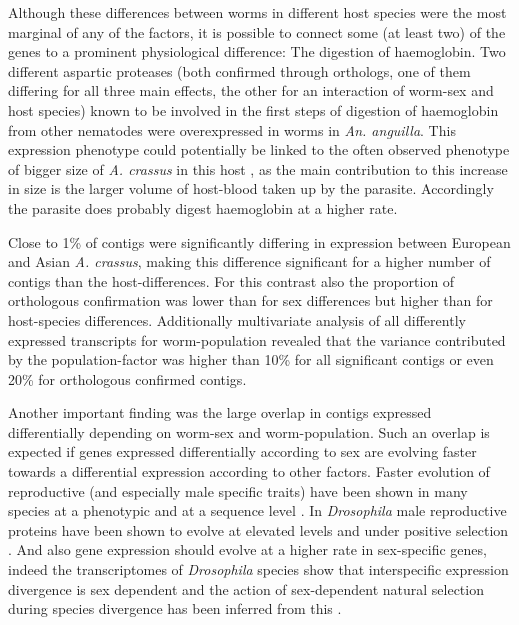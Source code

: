Although these differences between worms in different host species
were the most marginal of any of the factors, it is possible to
connect some (at least two) of the genes to a prominent physiological
difference: The digestion of haemoglobin. Two different aspartic
proteases (both confirmed through orthologs, one of them differing
for all three main effects, the other for an interaction of worm-sex
and host species) known to be involved in the first steps of digestion
of haemoglobin from other nematodes \cite{pmid12782060} were
overexpressed in worms in \textit{An. anguilla}. This expression
phenotype could potentially be linked to the often observed phenotype
of bigger size of \textit{A. crassus} in this host
\cite{knopf_swimbladder_2006}, as the main contribution to this
increase in size is the larger volume of host-blood taken up by the
parasite. Accordingly the parasite does probably digest haemoglobin at
a higher rate.

Close to 1\% of contigs were significantly differing in expression
between European and Asian \textit{A. crassus}, making this difference
significant for a higher number of contigs than the
host-differences. For this contrast also the proportion of orthologous
confirmation was lower than for sex differences but higher than for
host-species differences. Additionally multivariate analysis of all
differently expressed transcripts for worm-population revealed that
the variance contributed by the population-factor was higher than 10\%
for all significant contigs or even 20\% for orthologous confirmed
contigs.

Another important finding was the large overlap in contigs expressed
differentially depending on worm-sex and worm-population. Such an
overlap is expected if genes expressed differentially according to sex
are evolving faster towards a differential expression according to
other factors. Faster evolution of reproductive (and especially male
specific traits) have been shown in many species at a phenotypic and
at a sequence level \cite{pmid15795858}. In \textit{Drosophila} male
reproductive proteins have been shown to evolve at elevated levels and
under positive selection \cite{pmid11404480}. And also gene expression
should evolve at a higher rate in sex-specific genes, indeed the
transcriptomes of \textit{Drosophila} species show that interspecific
expression divergence is sex dependent and the action of sex-dependent
natural selection during species divergence has been inferred from
this \cite{pmid15034135,pmid19720861}.

